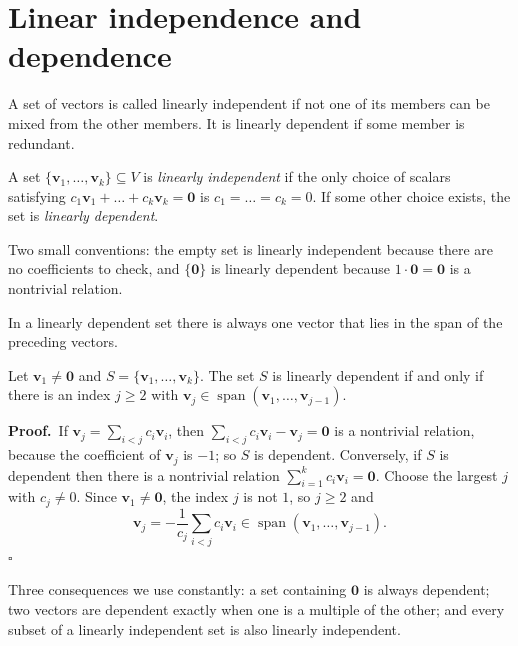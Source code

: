 \section{Linear independence and dependence}

A set of vectors is called linearly independent if not one of its members can be mixed from the
other members. It is linearly dependent if some member is redundant.

\begin{definisi}
A set $\{\mathbf{v}_{1},\dots,\mathbf{v}_{k}\}\subseteq V$ is \emph{linearly independent} if the
only choice of scalars satisfying
$c_{1}\mathbf{v}_{1}+\dots+c_{k}\mathbf{v}_{k}=\mathbf{0}$ is
$c_{1}=\dots=c_{k}=0$. If some other choice exists, the set is \emph{linearly dependent}.
\end{definisi}

Two small conventions: the empty set is linearly independent because there are no coefficients to
check, and $\{\mathbf{0}\}$ is linearly dependent because $1\cdot\mathbf{0}=\mathbf{0}$ is a
nontrivial relation.

In a linearly dependent set there is always one vector that lies in the span of the preceding
vectors.

\begin{lemma}[Dependence]
Let $\mathbf{v}_{1}\neq\mathbf{0}$ and $S=\{\mathbf{v}_{1},\dots,\mathbf{v}_{k}\}$.
The set $S$ is linearly dependent if and only if there is an index $j\ge 2$ with
$\mathbf{v}_{j}\in\operatorname{span}(\mathbf{v}_{1},\dots,\mathbf{v}_{j-1})$.
\end{lemma}

\par\medskip\noindent\textbf{Proof.}\ 
If $\mathbf{v}_{j}=\sum_{i<j}c_{i}\mathbf{v}_{i}$, then
$\sum_{i<j}c_{i}\mathbf{v}_{i}-\mathbf{v}_{j}=\mathbf{0}$ is a nontrivial relation, because the
coefficient of $\mathbf{v}_{j}$ is $-1$; so $S$ is dependent. Conversely, if $S$ is dependent then
there is a nontrivial relation $\sum_{i=1}^{k}c_{i}\mathbf{v}_{i}=\mathbf{0}$. Choose the largest
$j$ with $c_{j}\neq 0$. Since $\mathbf{v}_{1}\neq\mathbf{0}$, the index $j$ is not $1$, so
$j\ge 2$ and
\[
  \mathbf{v}_{j}=-\frac{1}{c_{j}}\sum_{i<j}c_{i}\mathbf{v}_{i}
  \in\operatorname{span}(\mathbf{v}_{1},\dots,\mathbf{v}_{j-1}).
\]
\hfill$\square$\par\medskip

Three consequences we use constantly: a set containing $\mathbf{0}$ is always dependent; two
vectors are dependent exactly when one is a multiple of the other; and every subset of a linearly
independent set is also linearly independent.

